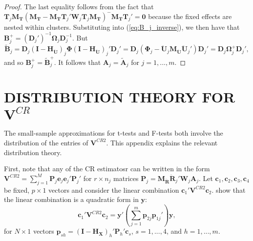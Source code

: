 \documentclass[12pt]{article}
\newcommand{\bm}{\mathbf}
\newcommand{\bs}{\boldsymbol}
\begin{document}
\begin{proof}
The last equality follows from the fact that $\bm{T}_j \bm{M_T}\left(\bm{M_T} - \bm{M_T}\bm{T}_j' \bm{W}_j \bm{T}_j\bm{M_T}\right)^{-} \bm{M_T} \bm{T}_j' = \bm{0}$ because the fixed effects are nested within clusters. 
Substituting into (\ref{eq:B_j_inverse}), we then have that $\bm{B}_j^+ = \left(\bm{D}_j'\right)^{-1} \bs\Omega_j \bm{D}_j^{-1}$. 
But \[
\bm{\tilde{B}}_j = \bm{D}_j \left(\bm{I} - \bm{H_{\ddot{U}}}\right)_j \bs\Phi \left(\bm{I} - \bm{H_{\ddot{U}}}\right)_j' \bm{D}_j' = \bm{D}_j \left(\bs\Phi_j - \bm{\ddot{U}}_j\bm{M_{\ddot{U}}} \bm{\ddot{U}}_j'\right) \bm{D}_j' = \bm{D}_j \bs\Omega_j^+ \bm{D}_j',
\]
and so $\bm{B}_j^+ = \bm{\tilde{B}}_j^+$. It follows that $\bm{A}_j = \bm{\tilde{A}}_j$ for $j = 1,...,m$. 
\end{proof}

\section{DISTRIBUTION THEORY FOR $\bm{V}^{CR}$}
\label{app:VCR_dist}

The small-sample approximations for t-tests and F-tests both involve the distribution of the entries of $\bm{V}^{CR2}$. This appendix explains the relevant distribution theory.

First, note that any of the CR estimatosr can be written in the form $\bm{V}^{CR2} = \sum_{j=1}^M \bm{P}_j \bm{e}_j \bm{e}_j' \bm{P}_j'$ for $r \times n_j$ matrices $\bm{P}_j = \bm{M_{\ddot{R}}} \bm{\ddot{R}}_j' \bm{W}_j \bm{A}_j$.
Let $\bm{c}_1,\bm{c}_2,\bm{c}_3,\bm{c}_4$ be fixed, $p \times 1$ vectors and consider the linear combination $\bm{c}_1' \bm{V}^{CR2} \bm{c}_2$. 
\citet[Theorem 4]{Bell2002bias} show that the linear combination is a quadratic form in $\bm{y}$: \[
\bm{c}_1' \bm{V}^{CR2} \bm{c}_2 = \bm{y}'\left(\sum_{j=1}^m \bm{p}_{2j} \bm{p}_{1j}'\right) \bm{y}, \]
for $N \times 1$ vectors $\bm{p}_{sh} = \left(\bm{I} - \bm{H_X}\right)_h' \bm{P}_h' \bm{c}_s$, $s = 1,...,4$, and $h = 1,...,m$. 
\end{document}
